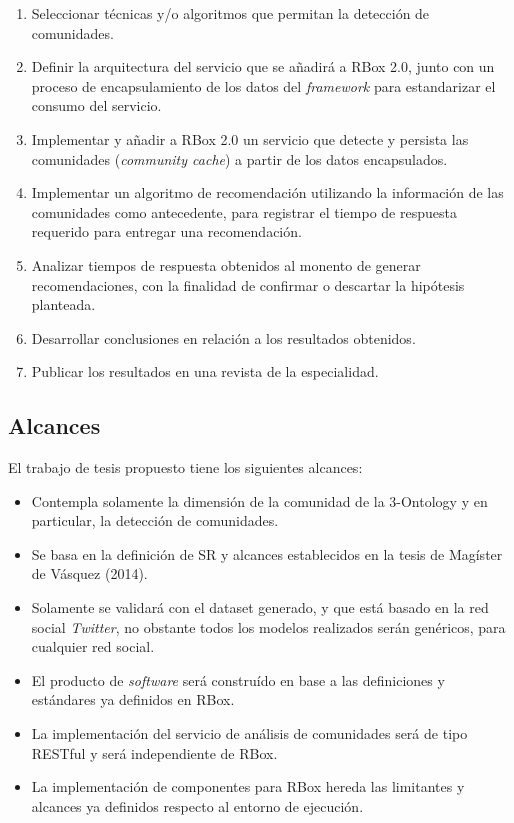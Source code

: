 \begin{enumerate}
  \item Seleccionar técnicas y/o algoritmos que permitan la detección de comunidades.
  \item Definir la arquitectura del servicio que se añadirá a RBox 2.0, junto con un proceso de encapsulamiento de los datos del \textit{framework} para estandarizar el consumo del servicio.
  \item Implementar y añadir a RBox 2.0 un servicio que detecte y persista las comunidades (\textit{community cache}) a partir de los datos encapsulados.
  \item Implementar un algoritmo de recomendación utilizando la información de las comunidades como antecedente, para registrar el tiempo de respuesta requerido para entregar una recomendación.
  \item Analizar tiempos de respuesta obtenidos al monento de generar recomendaciones, con la finalidad de confirmar o descartar la hipótesis planteada.
  \item Desarrollar conclusiones en relación a los resultados obtenidos.
  \item Publicar los resultados en una revista de la especialidad.
\end{enumerate}

\subsection{Alcances}

El trabajo de tesis propuesto tiene los siguientes alcances:

\begin{itemize}
  \item Contempla solamente la dimensión de la comunidad de la 3-Ontology y en particular, la detección de comunidades.
  \item Se basa  en la definición de SR y alcances establecidos en la tesis de Magíster de Vásquez (2014).
  \item Solamente se validará con el dataset generado, y que está basado en la red social \textit{Twitter}, no obstante todos los modelos realizados serán genéricos, para cualquier red social.
  \item El producto de \textit{software} será construído en base a las definiciones y estándares ya definidos en RBox.
  \item La implementación del servicio de análisis de comunidades será de tipo RESTful y será independiente de RBox.
  \item La implementación de componentes para RBox hereda las limitantes y alcances ya definidos respecto al entorno de ejecución.
\end{itemize}


